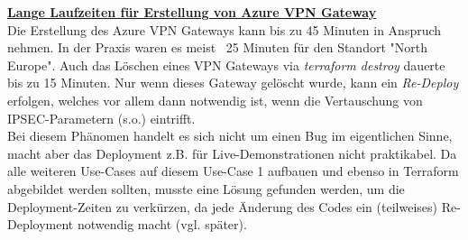 \textbf{\underline{Lange Laufzeiten für Erstellung von Azure VPN Gateway}}\\
Die Erstellung des Azure VPN Gateways kann bis zu 45 Minuten in Anspruch nehmen. In der Praxis waren es meist ~25 Minuten für den Standort "North Europe". Auch das Löschen eines VPN Gateways via \textit{terraform destroy} dauerte bis zu 15 Minuten. Nur wenn dieses Gateway gelöscht wurde, kann ein \textit{Re-Deploy} erfolgen, welches vor allem dann notwendig ist, wenn die Vertauschung von IPSEC-Parametern (s.o.) eintrifft.\\
Bei diesem Phänomen handelt es sich nicht um einen Bug im eigentlichen Sinne, macht aber das Deployment z.B. für Live-Demonstrationen nicht praktikabel. Da alle weiteren Use-Cases auf diesem Use-Case 1 aufbauen und ebenso in Terraform abgebildet werden sollten, musste eine Lösung gefunden werden, um die Deployment-Zeiten zu verkürzen, da jede Änderung des Codes ein (teilweises) Re-Deployment notwendig macht (vgl. später).


